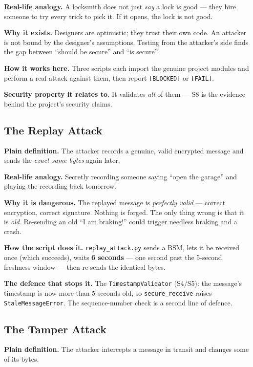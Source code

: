 \documentclass[11pt,a4paper]{report}
\begin{document}
\textbf{Real-life analogy.} A locksmith does not just \emph{say} a lock is good
--- they hire someone to try every trick to pick it. If it opens, the lock is
not good.

\textbf{Why it exists.} Designers are optimistic; they trust their own code. An
attacker is not bound by the designer's assumptions. Testing from the attacker's
side finds the gap between ``should be secure'' and ``is secure''.

\textbf{How it works here.} Three scripts each import the genuine project modules
and perform a real attack against them, then report \texttt{[BLOCKED]} or
\texttt{[FAIL]}.

\textbf{Security property it relates to.} It validates \emph{all} of them ---
S8 is the evidence behind the project's security claims.

\subsection{The Replay Attack}
\textbf{Plain definition.} The attacker records a genuine, valid encrypted
message and sends the \emph{exact same bytes} again later.

\textbf{Real-life analogy.} Secretly recording someone saying ``open the garage''
and playing the recording back tomorrow.

\textbf{Why it is dangerous.} The replayed message is \emph{perfectly valid} ---
correct encryption, correct signature. Nothing is forged. The only thing wrong is
that it is \emph{old}. Re-sending an old ``I am braking!'' could trigger needless
braking and a crash.

\textbf{How the script does it.} \texttt{replay\_attack.py} sends a BSM, lets it
be received once (which succeeds), waits \textbf{6 seconds} --- one second past
the 5-second freshness window --- then re-sends the identical bytes.

\textbf{The defence that stops it.} The \texttt{TimestampValidator} (S4/S5): the
message's timestamp is now more than 5 seconds old, so
\texttt{secure\_receive} raises \texttt{StaleMessageError}. The sequence-number
check is a second line of defence.

\subsection{The Tamper Attack}
\textbf{Plain definition.} The attacker intercepts a message in transit and
changes some of its bytes.
\end{document}
